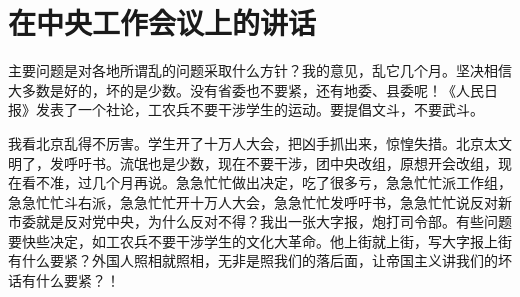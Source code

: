 \section[在中央工作会议上的讲话（一九六六年八月二十三日）]{在中央工作会议上的讲话}


主要问题是对各地所谓乱的问题采取什么方针？我的意见，乱它几个月。坚决相信大多数是好的，坏的是少数。没有省委也不要紧，还有地委、县委呢！《人民日报》发表了一个社论，工农兵不要干涉学生的运动。要提倡文斗，不要武斗。

我看北京乱得不厉害。学生开了十万人大会，把凶手抓出来，惊惶失措。北京太文明了，发呼吁书。流氓也是少数，现在不要干涉，团中央改组，原想开会改组，现在看不准，过几个月再说。急急忙忙做出决定，吃了很多亏，急急忙忙派工作组，急急忙忙斗右派，急急忙忙开十万人大会，急急忙忙发呼吁书，急急忙忙说反对新市委就是反对党中央，为什么反对不得？我出一张大字报，炮打司令部。有些问题要快些决定，如工农兵不要干涉学生的文化大革命。他上街就上街，写大字报上街有什么要紧？外国人照相就照相，无非是照我们的落后面，让帝国主义讲我们的坏话有什么要紧？！


